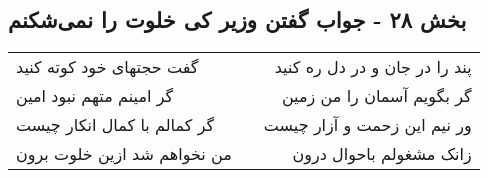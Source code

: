 \begin{center}
\section*{بخش ۲۸ - جواب گفتن وزیر کی خلوت را نمی‌شکنم}
\label{sec:sh028}
\begin{longtable}{l p{0.5cm} r}
گفت حجتهای خود کوته کنید
&&
پند را در جان و در دل ره کنید
\\
گر امینم متهم نبود امین
&&
گر بگویم آسمان را من زمین
\\
گر کمالم با کمال انکار چیست
&&
ور نیم این زحمت و آزار چیست
\\
من نخواهم شد ازین خلوت برون
&&
زانک مشغولم باحوال درون
\\
\end{longtable}
\end{center}
